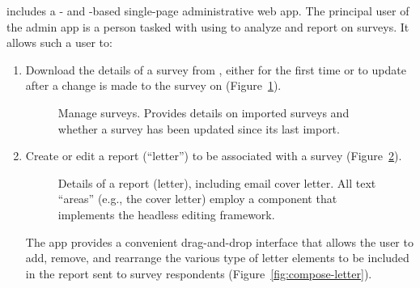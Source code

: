 \documentclass{article}
\begin{document}
\caper{} includes a \vue{}- and \vuetify{}-based
single-page
administrative web app.
The principal user of the admin app
is a person tasked with using \caper{}
to analyze and report on \qual{} surveys.
It allows such a user to:
\begin{enumerate}
\item
  Download the details of a survey from \qual{},
  either for the first time or to update \caper{} after a change is made to the survey on \qual{}
  (Figure~\ref{fig:manage-qualtrics}).


  \begin{figure}
    \centering
    \caption{
      Manage \qual{} surveys.
      Provides details on imported surveys
      and whether a survey has been updated since its last import.
    }
    \label{fig:manage-qualtrics}
  \end{figure}
\item
  Create or edit a report (``letter'') to be associated with a survey
  (Figure~\ref{fig:letter-details}).

  
  \begin{figure}
    \centering
    \caption{
      Details of a report (letter), including email cover letter.
      All text ``areas'' (e.g., the cover letter)
      employ a \caper{} component that implements
      the \tiptap{} headless editing framework.
    }
    \label{fig:letter-details}
  \end{figure}

  The app provides a convenient drag-and-drop interface
  that allows the user to add, remove, and rearrange the various type of
  letter elements to be included in the report sent to survey respondents
  (Figure~\ref{fig:compose-letter}).



\end{enumerate}
\end{document}
